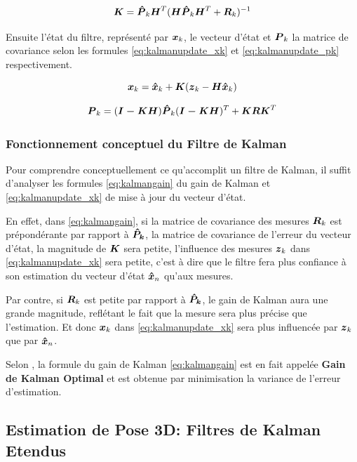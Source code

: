 \documentclass[12pt,a4paper]{report}
\begin{document}
	\begin{equation}
	\label{eq:kalmangain}
	\boldsymbol{K} = \boldsymbol{\hat{P}}_k \boldsymbol{H}^T (\boldsymbol{H} \boldsymbol{\hat{P}}_k \boldsymbol{H}^T + \boldsymbol{R}_k ) ^{-1}
	\end{equation}
	
	
	\para Ensuite l'état du filtre, représenté par $\boldsymbol{x}_k$, le vecteur d'état et $\boldsymbol{P}_k$ la matrice de covariance selon les formules \ref{eq:kalmanupdate_xk} et \ref{eq:kalmanupdate_pk} respectivement.
	
	\begin{equation}
	\label{eq:kalmanupdate_xk}
	\boldsymbol{x}_k = \boldsymbol{\hat{x}}_k + \boldsymbol{K} (\boldsymbol{z}_k - \boldsymbol{H \hat{x}}_k)
	\end{equation}
	
	\begin{equation}
	\label{eq:kalmanupdate_pk}
	\boldsymbol{P}_k = (\boldsymbol{I-KH})\boldsymbol{\hat{P}}_k(\boldsymbol{I-KH})^T + \boldsymbol{KRK}^T
	\end{equation}


	\subsubsection{Fonctionnement conceptuel du Filtre de Kalman}
	Pour comprendre conceptuellement ce qu'accomplit un filtre de Kalman, il suffit d'analyser les formules \ref{eq:kalmangain} du gain de Kalman et \ref{eq:kalmanupdate_xk} de mise à jour du vecteur d'état.
	
	\para En effet, dans \ref{eq:kalmangain}, si la matrice de covariance des mesures $\boldsymbol{R}_k$ est prépondérante par rapport à $\boldsymbol{\hat{P}_k}$, la matrice de covariance de l'erreur du vecteur d'état, la magnitude de $\boldsymbol{K}$ sera petite, l'influence des mesures $\boldsymbol{z}_k$ dans \ref{eq:kalmanupdate_xk} sera petite, c'est à dire que le filtre fera plus confiance à son estimation du vecteur d'état $\boldsymbol{\hat{x}}_n$ qu'aux mesures.
	
	\para Par contre, si $\boldsymbol{R}_k$ est petite par rapport à $\boldsymbol{\hat{P}_k}$, le gain de Kalman aura une grande magnitude, reflétant le fait que la mesure sera plus précise que l'estimation. Et donc $\boldsymbol{x}_k$ dans \ref{eq:kalmanupdate_xk} sera plus influencée par $\boldsymbol{z}_k$ que par $\boldsymbol{\hat{x}}_n$.
	
	\para Selon \cite{zarchan_fundamentals_2009}, la formule du gain de Kalman \ref{eq:kalmangain} est en fait appelée \textbf{Gain de Kalman Optimal} et est obtenue par minimisation la variance de l'erreur d'estimation.
	
	
	\subsection{Estimation de Pose 3D: Filtres de Kalman Etendus}
	
\end{document}
